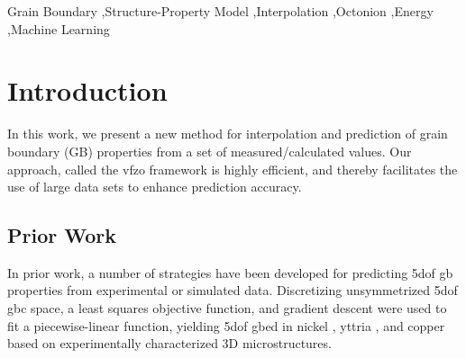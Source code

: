 \documentclass[final,twocolumn,12pt]{elsarticle}
\newcommand{\calcnum}[1]{%
    \pgfmathparse{#1}%
    \num[round-mode=places,round-precision=1]{\pgfmathresult}%
}
\newcommand{\matlab}[1]{\mbox{\lstinline[style=Matlab-editor]{#1}}}
\newcommand{\inpt}{input}
\newcommand{\outpt}{prediction}
\newcommand{\vfzorepo}{\gls{vfzo} repository}
\newcommand{\gprrmse}{0.0218}
\newcommand{\avgrmse}{0.1283}
\begin{document}
\begin{frontmatter}
\begin{abstract}
    for \num{50000} random \inpt{} \glspl{gb} and evaluated for \num{10000} random \outpt{} \glspl{gb}. In the best case (\gls{gpr}), this is an improvement by \calcnum{(\avgrmse-\gprrmse)/\avgrmse*100}\% relative to a constant, average model. Likewise, interpolation on a noisy, \gls{ms} Fe simulation dataset improves performance by \SI{34.4}{\percent} compared to \SI{21.2}{\percent} in prior work.
    A \gls{gpr} mixture model is also developed and applied for the Fe simulation dataset, yielding a simulation-based interpolation function for Fe \gls{gbe} with quantified uncertainty. A vectorized, parallelized, MATLAB interpolation function (\matlab{interp5DOF.m}) and related routines are made available in our \vfzorepo{} (\url{github.com/sgbaird-5dof/interp}). The \gls{vfzo} framework offers advantages for computing distances between \glspl{gb}, estimating property values for arbitrary \glspl{gb}, and modeling surrogates of computationally expensive \gls{5dof} functions and simulations.
\end{abstract}

\glsresetall %

\begin{keyword}
Grain Boundary \sep Structure-Property Model \sep Interpolation \sep Octonion \sep Energy \sep Machine Learning
\end{keyword}

\end{frontmatter}

\section{Introduction} \label{sec:intro}

In this work, we present a new method for interpolation and prediction of grain boundary (GB) properties from a set of measured/calculated values. Our approach, called the \gls{vfzo} framework is highly efficient, and thereby facilitates the use of large data sets to enhance prediction accuracy.

\subsection{Prior Work}
In prior work, a number of strategies have been developed for predicting \gls{5dof} \gls{gb} properties from experimental or simulated data. Discretizing unsymmetrized \gls{5dof} \gls{gbc} space, a least squares objective function, and gradient descent were used to fit a piecewise-linear function, yielding \gls{5dof} \gls{gbed} in nickel \cite{liRelativeGrainBoundary2009}, yttria \cite{dillonCharacterizationGrainboundaryCharacter2009}, and copper \cite{randleFiveparameterGrainBoundary2008} based on experimentally characterized 3D microstructures.
\end{document}
